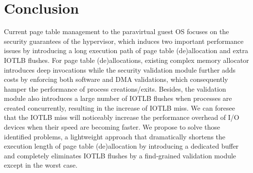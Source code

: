 \section{Conclusion} \label{sec:con}

Current page table management to the paravirtual guest OS focuses on the security guarantees of the hypervisor, which induces two important performance issues by introducing a long execution path of page table (de)allocation and extra IOTLB flushes. For page table (de)allocations, existing complex memory allocator introduces deep invocations while the security validation module further adds costs by enforcing both software and DMA validations, which consequently hamper the performance of process creations/exits. Besides, the validation module also introduces a large number of IOTLB flushes when processes are created concurrently, resulting in the increase of IOTLB miss. We can foresee that the IOTLB miss will noticeably increase the performance overhead of I/O devices when their speed are becoming faster. We propose \name to solve those identified problems, a lightweight approach that dramatically shortens the execution length of page table (de)allocation by introducing a dedicated buffer and completely eliminates IOTLB flushes by a find-grained validation module except in the worst case. 